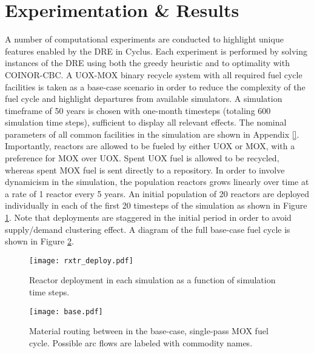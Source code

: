 \section{Experimentation \& Results}\label{results}

A number of computational experiments are conducted to highlight unique features
enabled by the DRE in Cyclus. Each experiment is performed by solving instances
of the DRE using both the greedy heuristic and to optimality with COINOR-CBC. A
UOX-MOX binary recycle system with all required fuel cycle facilities is taken
as a base-case scenario in order to reduce the complexity of the fuel cycle and
highlight departures from available simulators. A simulation timeframe of 50
years is chosen with one-month timesteps (totaling 600 simulation time steps),
sufficient to display all relevant effects. The nominal parameters of all common
facilities in the simulation are shown in Appendix \ref{}. Importantly, reactors
are allowed to be fueled by either UOX or MOX, with a preference for MOX over
UOX. Spent UOX fuel is allowed to be recycled, whereas spent MOX fuel is sent
directly to a repository. In order to involve dynamicism in the simulation, the
population reactors grows linearly over time at a rate of 1 reactor every 5
years. An initial population of 20 reactors are deployed individually in each of
the first 20 timesteps of the simulation as shown in Figure
\ref{fig:deploy}. Note that deployments are staggered in the initial period in
order to avoid supply/demand clustering effect. A diagram of the full
base-case fuel cycle is shown in Figure \ref{fig:base}.

\begin{figure}
  \begin{center}
    \texttt{[image: rxtr\_deploy.pdf]}
    \caption[]{
      \label{fig:deploy}
      Reactor deployment in each simulation as a function of simulation time steps.}
  \end{center}
\end{figure}

\begin{figure}
  \begin{center}
    \texttt{[image: base.pdf]}
    \caption[]{
      \label{fig:base}
      Material routing between in the base-case, single-pass MOX fuel
      cycle. Possible arc flows are labeled with commodity names.}
  \end{center}
\end{figure}

